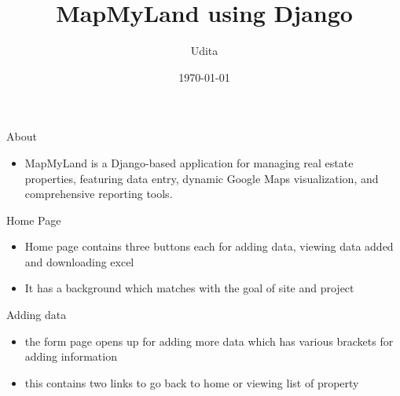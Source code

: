 \documentclass{beamer}
\title{MapMyLand using Django}
\author{Udita}
\institute{NIT Kurukshetra}
\date{\today}
\begin{document}
\maketitle



\begin{frame}{About}
  \begin{itemize}
    \item MapMyLand is a Django-based application for managing real estate properties, featuring data entry, dynamic Google Maps visualization, and comprehensive reporting tools.
  \end{itemize}
\end{frame}

\begin{frame}{Home Page}
  \begin{itemize}
    \item Home page contains three buttons each for adding data, viewing data added and downloading excel
    \item It has a background which matches with the goal of site and project
  \end{itemize}
\end{frame}

\begin{frame}{Adding data}
  \begin{itemize}
    \item the form page opens up for adding more data which has various brackets for adding information
    \item this contains two links to go back to home or viewing list of property
    
  \end{itemize}
\end{frame}
\end{document}
